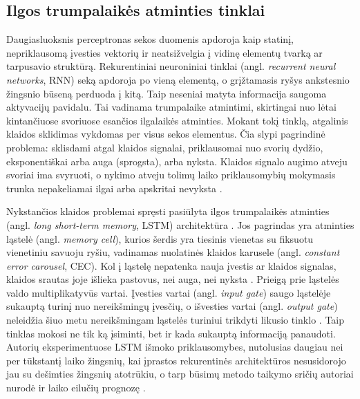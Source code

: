 
\subsection{Ilgos trumpalaikės atminties tinklai}

Daugiasluoksnis perceptronas sekos duomenis apdoroja kaip statinį, nepriklausomą įvesties vektorių ir neatsižvelgia į vidinę elementų tvarką ar tarpusavio struktūrą.
Rekurentiniai neuroniniai tinklai (angl. \textit{recurrent neural networks}, RNN) seką apdoroja po vieną elementą, o grįžtamasis ryšys ankstesnio žingsnio būseną perduoda į kitą.
Taip neseniai matyta informacija saugoma aktyvacijų pavidalu.
Tai vadinama trumpalaike atmintimi, skirtingai nuo lėtai kintančiuose svoriuose esančios ilgalaikės atminties\cite{hochreiter1997}.
Mokant tokį tinklą, atgalinis klaidos sklidimas vykdomas per visus sekos elementus.
Čia slypi pagrindinė problema: sklisdami atgal klaidos signalai, priklausomai nuo svorių dydžio, eksponentiškai arba auga (sprogsta), arba nyksta.
Klaidos signalo augimo atveju svoriai ima svyruoti, o nykimo atveju tolimų laiko priklausomybių mokymasis trunka nepakeliamai ilgai arba apskritai nevyksta \cite{hochreiter1997}.

Nykstančios klaidos problemai spręsti pasiūlyta ilgos trumpalaikės atminties (angl. \textit{long short-term memory}, LSTM) architektūra \cite{hochreiter1997}.
Jos pagrindas yra atminties ląstelė (angl. \textit{memory cell}), kurios šerdis yra tiesinis vienetas su fiksuotu vienetiniu savuoju ryšiu, vadinamas nuolatinės klaidos karusele (angl. \textit{constant error carousel}, CEC).
Kol į ląstelę nepatenka nauja įvestis ar klaidos signalas, klaidos srautas joje išlieka pastovus, nei auga, nei nyksta \cite{gers2000}.
Prieigą prie ląstelės valdo multiplikatyvūs vartai.
Įvesties vartai (angl. \textit{input gate}) saugo ląstelėje sukauptą turinį nuo nereikšmingų įvesčių, o išvesties vartai (angl. \textit{output gate}) neleidžia šiuo metu nereikšmingam ląstelės turiniui trikdyti likusio tinklo \cite{hochreiter1997}.
Taip tinklas mokosi ne tik ką įsiminti, bet ir kada sukauptą informaciją panaudoti.
Autorių eksperimentuose LSTM išmoko priklausomybes, nutolusias daugiau nei per tūkstantį laiko žingsnių, kai įprastos rekurentinės architektūros nesusidorojo jau su dešimties žingsnių atotrūkiu, o tarp būsimų metodo taikymo sričių autoriai nurodė ir laiko eilučių prognozę \cite{hochreiter1997}.


